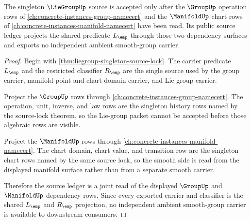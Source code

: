 \begin{theorem}
\label{thm:liegroup-manifold-group-anchor}
The singleton $\LieGroupUp$ source is accepted only after the $\GroupUp$ operation rows of \autoref{ch:concrete-instances-group-namecert} and the $\ManifoldUp$ chart rows of \autoref{ch:concrete-instances-manifold-namecert} have been read. Its public source ledger projects the shared predicate $L_{\emp}$ through those two dependency surfaces and exports no independent ambient smooth-group carrier.
\end{theorem}
\begin{proof}
Begin with \autoref{thm:liegroup-singleton-source-lock}. The carrier predicate $L_{\emp}$ and the restricted classifier $R_{\emp}$ are the single source used by the group carrier, manifold point and chart-domain carrier, and Lie-group carrier.

Project the $\GroupUp$ rows through \autoref{ch:concrete-instances-group-namecert}. The operation, unit, inverse, and law rows are the singleton history rows named by the source-lock theorem, so the Lie-group packet cannot be accepted before those algebraic rows are visible.

Project the $\ManifoldUp$ rows through \autoref{ch:concrete-instances-manifold-namecert}. The chart domain, chart value, and transition row are the singleton chart rows named by the same source lock, so the smooth side is read from the displayed manifold surface rather than from a separate smooth carrier.

Therefore the source ledger is a joint read of the displayed $\GroupUp$ and $\ManifoldUp$ dependency rows. Since every exported carrier and classifier is the shared $L_{\emp}$ and $R_{\emp}$ projection, no independent ambient smooth-group carrier is available to downstream consumers.
\end{proof}

